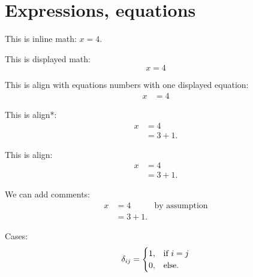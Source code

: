 \section{Expressions, equations}


This is inline math: $x=4$. 

This is displayed math: 
$$x = 4$$ 

This is align with equations numbers with one displayed equation: 
\begin{align}
x &= 4
\end{align}

This is align*: 
\begin{align*}
x &= 4 \\
& = 3+1.
\end{align*}






This is align: 
\begin{align}
x   &= 4 \\
    &= 3+1.
\end{align}

We can add comments: 
\begin{align}
x &= 4 
    & \textrm{by assumption} \\
& = 3+1.
\end{align}

Cases: 
$$\delta_{ij} = \begin{cases}
1, & \textrm{if }i=j \\
0, & \textrm{else.}
\end{cases}$$